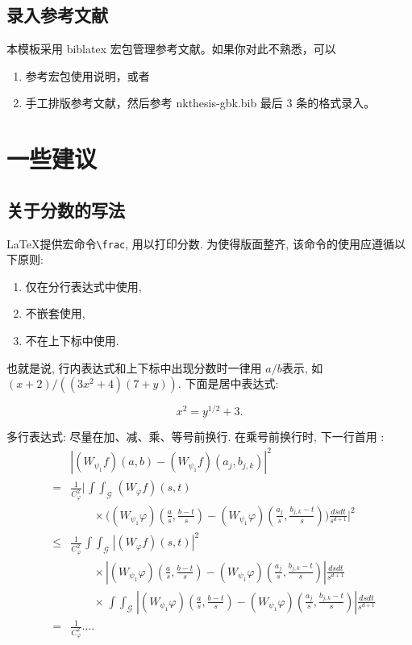 \subsection{录入参考文献}

本模板采用 biblatex 宏包管理参考文献。如果你对此不熟悉，可以
\begin{enumerate}
\item 参考宏包使用说明，或者
\item 手工排版参考文献，然后参考 nkthesis-gbk.bib 最后 3 条的格式录入。
\end{enumerate}



\section{一些建议}
\subsection{关于分数的写法}


\LaTeX 提供宏命令\verb+\frac+, 用以打印分数. 为使得版面整齐, 该命令的使用应遵循以下原则:

\begin{enumerate}
\item 仅在分行表达式中使用,
\item 不嵌套使用,
\item 不在上下标中使用.
\end{enumerate}

也就是说, 行内表达式和上下标中出现分数时一律用 $a/b$表示, 如
$(x+2)/((3x^2+4)(7+y))$. 下面是居中表达式:

\[
 x^2 = y^{1/2} +3.
\]

多行表达式: 尽量在加、减、乘、等号前换行. 在乘号前换行时,
下一行首用 \string\times:
\def\iint{\mathop{\int\!\!\!\int}}\def\calG{\mathcal G}
\begin{eqnarray}
&&\left|(W_{\psi_1}f)(a,b)-(W_{\psi_1}f)(a_j,b_{j,k})\right|^{2}\nonumber\\
&=&\frac{1}{C^{2}_{\varphi}}\Bigg|\iint_{\calG} (W_{\varphi}f)(s,t) \nonumber\\
&&\qquad\times \Bigg( (W_{\psi_1}\varphi)\left(\frac{a}{s},
\frac{b-t}{s}\right)
     -(W_{\psi_1}\varphi)\left(\frac{a_{j}}{s}, \frac{b_{j,k}-t}{s}\right)\Bigg)
  \frac{dsdt}{s^{d+1}}\Bigg|^2 \nonumber\\
&\le& \frac{1}{C^2_{\varphi}} \iint_{\calG} |(W_{\varphi}f)(s,t)|^2 \nonumber\\
&&\qquad \times\left| (W_{\psi_1}\varphi)\left(\frac{a}{s},
\frac{b-t}{s}\right)
    -(W_{\psi_1}\varphi)\left(\frac{a_{j}}{s}, \frac{b_{j,k}-t}{s}\right)\right|
   \frac{dsdt}{s^{d+1}}  \nonumber\\
&&\qquad \times   \iint_{\calG}\!
 \left|(W_{\psi_1}\varphi)\left(\frac{a}{s}, \frac{b-t}{s}\right)
    -(W_{\psi_1}\varphi)\left(\frac{a_{j}}{s}, \frac{b_{j,k}-t}{s}\right)\right|
 \frac{ ds dt}{s^{d+1}} \nonumber\\
&=& \frac{1}{C^2_{\varphi}} ....  \label{eq:a0}
\end{eqnarray}


